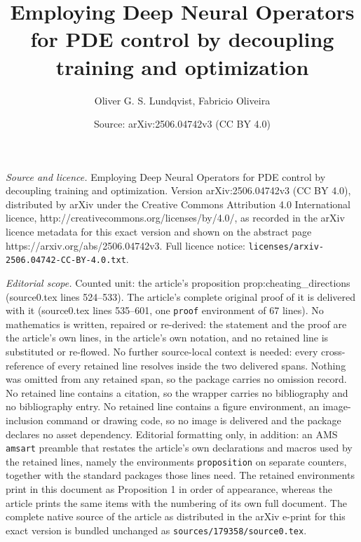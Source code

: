\documentclass[10pt,a4paper]{amsart}
\title{Employing Deep Neural Operators for PDE control by decoupling training and optimization}
\author{Oliver G. S. Lundqvist, Fabricio Oliveira}
\date{Source: arXiv:2506.04742v3 (CC BY 4.0)}
\begin{document}
\maketitle

\noindent\emph{Source and licence.} Employing Deep Neural Operators for PDE control by decoupling training and optimization. Version arXiv:2506.04742v3 (CC BY 4.0), distributed by arXiv under the Creative Commons Attribution 4.0 International licence, http://creativecommons.org/licenses/by/4.0/, as recorded in the arXiv licence metadata for this exact version and shown on the abstract page https://arxiv.org/abs/2506.04742v3. Full licence notice: \texttt{licenses/arxiv-2506.04742-CC-BY-4.0.txt}.\par\smallskip

\noindent\textit{Editorial scope.} Counted unit: the article's proposition prop:cheating\_directions (source0.tex lines 524--533). The article's complete original proof of it is delivered with it (source0.tex lines 535--601, one \texttt{proof} environment of 67 lines). No mathematics is written, repaired or re-derived: the statement and the proof are the article's own lines, in the article's own notation, and no retained line is substituted or re-flowed.  No further source-local context is needed: every cross-reference of every retained line resolves inside the two delivered spans.  Nothing was omitted from any retained span, so the package carries no omission record.  No retained line contains a citation, so the wrapper carries no bibliography and no bibliography entry.  No retained line contains a figure environment, an image-inclusion command or drawing code, so no image is delivered and the package declares no asset dependency.  Editorial formatting only, in addition: an AMS \texttt{amsart} preamble that restates the article's own declarations and macros used by the retained lines, namely the environments \texttt{proposition} on separate counters, together with the standard packages those lines need.  The retained environments print in this document as Proposition 1 in order of appearance, whereas the article prints the same items with the numbering of its own full document.  The complete native source of the article as distributed in the arXiv e-print for this exact version is bundled unchanged as \texttt{sources/179358/source0.tex}.
\end{document}
